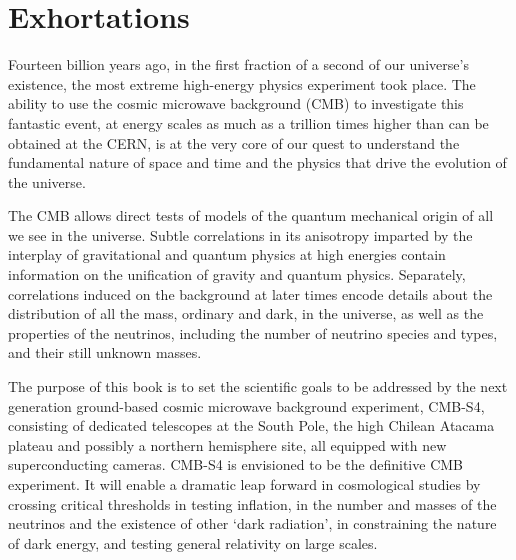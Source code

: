  
\chapter{Exhortations}
\label{chap:intro}






Fourteen billion years ago, in the first fraction of a second of our universe's existence, the most extreme high-energy physics experiment took place. The ability to use the cosmic microwave background (CMB) to investigate this fantastic event, at energy scales as much as a trillion times higher than can be obtained at the CERN, is at the very core of our quest to understand the fundamental nature of space and time and the physics that drive the evolution of the universe. 

The CMB allows direct tests of models of the quantum mechanical origin of all we see in the universe. Subtle correlations in its anisotropy imparted by the interplay of gravitational and quantum physics at high energies contain information on the unification of gravity and quantum physics. Separately, correlations induced on the background at later times encode details about the distribution of all the mass, ordinary and dark, in the universe, as well as the properties of the neutrinos, including the number of neutrino species and types, and their still unknown masses. 

The purpose of this book is to set the scientific goals to be addressed by the next generation ground-based cosmic microwave background experiment, CMB-S4, consisting of dedicated telescopes at the South Pole, the high Chilean Atacama plateau and possibly a northern hemisphere site, all equipped with new superconducting cameras. CMB-S4 
is envisioned to be the definitive CMB experiment. It will enable a dramatic leap forward in cosmological studies by crossing critical thresholds in testing inflation, in the number and masses of the neutrinos and the existence of other `dark radiation', in  constraining the nature of dark energy, and testing general relativity on large scales. 

